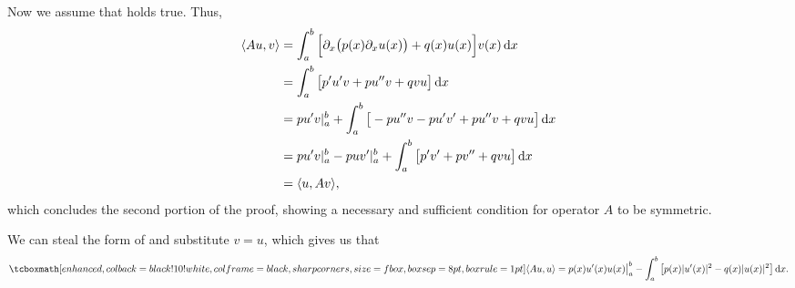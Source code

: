 Now we assume that  holds true.
Thus,
\begin{align}
    \label{eq:backward-direc}
    \langle Au,v \rangle &= \int_{a}^{b} \Big[ \partial_{x} \big( p(x)\partial_{x}u(x) \big) + q(x)u(x) \Big] v(x) \dd{x} \notag \\
                         &= \int_{a}^{b} \big[ p'u'v + pu''v + qvu \big] \dd{x} \notag \\
                         &= pu'v|_{a}^{b} + \int_{a}^{b} \big[ -pu''v - pu'v' + pu''v + qvu \big] \dd{x} \\
                         &= pu'v|_{a}^{b} - puv'|_{a}^{b} + \int_{a}^{b} \big[ p'v' + pv'' + qvu \big] \dd{x} \notag \\
                         &= \langle u,Av \rangle
,\end{align}
which concludes the second portion of the proof, showing a necessary and sufficient condition for operator $A$ to be symmetric.


We can steal the form of  and substitute $v = u$, which gives us that
\begin{eqnarray}
    \label{eq:res-17.2-work}
    \eqbox{
    \langle Au,u \rangle =  p(x)u'(x)u(x) \big|_{a}^{b} - \int_{a}^{b} \big[ p(x)|u'(x)|^2 - q(x)|u(x)|^2 \big] \dd{x}
}
.\end{eqnarray}




